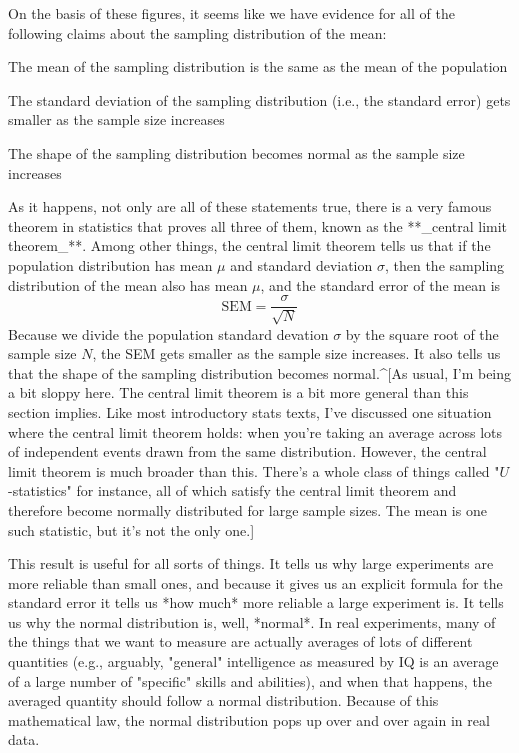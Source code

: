 On the basis of these figures, it seems like we have evidence for all of the following claims about the sampling distribution of the mean:
 \itemsep -2pt
\item The mean of the sampling distribution is the same as the mean of the population
\item The standard deviation of the sampling distribution (i.e., the standard error) gets smaller as the sample size increases
\item The shape of the sampling distribution becomes normal as the sample size increases

As it happens, not only are all of these statements true, there is a very famous theorem in statistics that proves all three of them, known as the **_central limit theorem_**. Among other things, the central limit theorem tells us that if the population distribution has mean $\mu$ and standard deviation $\sigma$, then the sampling distribution of the mean also has mean $\mu$, and the standard error of the mean is 
$$
\mbox{SEM} = \frac{\sigma}{ \sqrt{N} }
$$ 
Because we divide the population standard devation $\sigma$ by the square root of the sample size $N$, the SEM gets smaller as the sample size increases. It also tells us that the shape of the sampling distribution becomes normal.^[As usual, I'm being a bit sloppy here. The central limit theorem is a bit more general than this section implies. Like most introductory stats texts, I've discussed one situation where the central limit theorem holds: when you're taking an average across lots of independent events drawn from the same distribution. However, the central limit theorem is much broader than this. There's a whole class of things called "$U$-statistics" for instance, all of which satisfy the central limit theorem and therefore become normally distributed for large sample sizes. The mean is one such statistic, but it's not the only one.] 

This result is useful for all sorts of things. It tells us why large experiments are more reliable than small ones, and because it gives us an explicit formula for the standard error it tells us *how much* more reliable a large experiment is. It tells us why the normal distribution is, well, *normal*. In real experiments, many of the things that we want to measure are actually averages of lots of different quantities (e.g., arguably, "general" intelligence as measured by IQ is an average of a large number of "specific" skills and abilities), and when that happens, the averaged quantity should follow a normal distribution. Because of this mathematical law, the normal distribution pops up over and over again in real data. 




